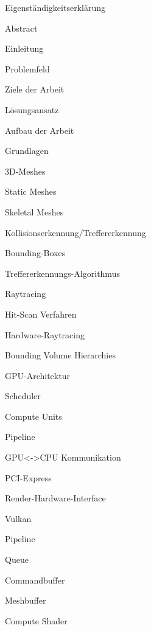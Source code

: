 \documentclass[11pt]{scrartcl}
\begin{document}
	{\parindent=5mm 
		Eigenständigkeitserklärung
		
		Abstract}
	
	\begin{gliederung}
		\item Einleitung
		\begin{gliederung}
			\item Problemfeld
			\item Ziele der Arbeit
			\item Lösungsansatz
			\item Aufbau der Arbeit
		\end{gliederung}
		
		\item Grundlagen
		\begin{gliederung}
			\item 3D-Meshes
			\begin{gliederung}
				\item Static Meshes
				\item Skeletal Meshes
			\end{gliederung}
			\item Kollisionserkennung/Treffererkennung %
			\begin{gliederung}
				\item Bounding-Boxes
				\item Treffererkennungs-Algorithmus
			\end{gliederung}
			\item Raytracing
			\begin{gliederung}
				\item Hit-Scan Verfahren
			\end{gliederung}
			\item Hardware-Raytracing
			\item Bounding Volume Hierarchies
			\item GPU-Architektur
			\begin{gliederung}
				\item Scheduler
				\item Compute Units
				\item Pipeline
			\end{gliederung}
			\item GPU<->CPU Kommunikation
			\begin{gliederung}
				\item PCI-Express
			\end{gliederung}
			\item Render-Hardware-Interface
			\begin{gliederung}
				\item Vulkan
				\begin{gliederung}
					\item Pipeline
					\item Queue
					\item Commandbuffer
					\item Meshbuffer
					\item Compute Shader
				\end{gliederung}
			\end{gliederung}
		\end{gliederung}
		

\end{gliederung}
\end{document}
